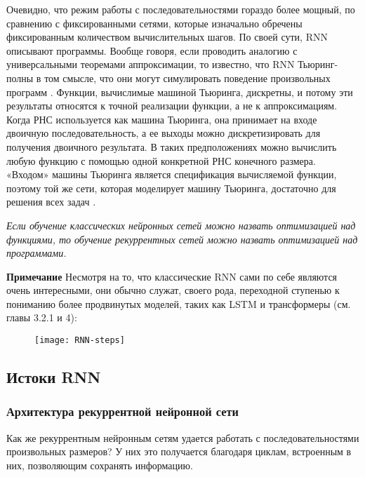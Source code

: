 Очевидно, что режим работы с последовательностями гораздо более мощный, по сравнению 
с фиксированными сетями, которые изначально обречены фиксированным количеством 
вычислительных шагов. По своей сути, RNN описывают программы. Вообще говоря, 
если проводить аналогию с универсальными теоремами аппроксимации, то известно, что 
RNN Тьюринг-полны в том смысле, что они могут симулировать поведение произвольных 
программ \cite{karpathy}. Функции, вычислимые машиной Тьюринга, дискретны, и потому 
эти результаты относятся к точной реализации функции, а не к аппроксимациям. 
Когда РНС используется как машина Тьюринга, она принимает на входе двоичную 
последовательность, а ее выходы можно дискретизировать для получения двоичного результата. В таких
предположениях можно вычислить любую функцию с помощью одной конкретной
РНС конечного размера. «Входом» машины Тьюринга является спецификация вычисляемой
функции, поэтому той же сети, которая моделирует машину Тьюринга, достаточно
для решения всех задач \cite{Goodfellow-et-al-2016}.
\begin{center}
    \textit{Если обучение классических нейронных сетей можно назвать оптимизацией над 
    функциями, то обучение рекуррентных сетей можно назвать оптимизацией над программами.}
\end{center}

\noindent\textbf{Примечание} \hspace{10pt} Несмотря на то, что классические RNN сами по себе являются очень интересными, 
они обычно служат, своего рода, переходной ступенью к пониманию более 
продвинутых моделей, таких как LSTM и трансформеры (см. главы 3.2.1 и 4):

\begin{figure}[h!]
    \centering
    \texttt{[image: RNN-steps]}
    \caption{\cite{statquest_ml_series}}
    \label{fig:RNN-steps}
\end{figure}

\newpage

\subsection{Истоки RNN}

\subsubsection{Архитектура рекуррентной нейронной сети}

Как же рекуррентным нейронным сетям удается работать с последовательностями 
произвольных размеров? У них это получается благодаря циклам, встроенным 
в них, позволяющим сохранять информацию.

